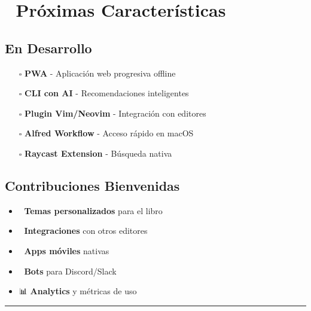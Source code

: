 \documentclass[
  11pt,
  letterpaper,
  oneside,
  openany]{scrbook}
\providecommand{\tightlist}{%
  \setlength{\itemsep}{0pt}\setlength{\parskip}{0pt}}
\begin{document}
\section{🚀 Próximas
Características}\label{pruxf3ximas-caracteruxedsticas}

\subsection{En Desarrollo}\label{en-desarrollo}

\begin{itemize}
\tightlist
\item[$\square$]
  \textbf{PWA} - Aplicación web progresiva offline
\item[$\square$]
  \textbf{CLI con AI} - Recomendaciones inteligentes\\
\item[$\square$]
  \textbf{Plugin Vim/Neovim} - Integración con editores
\item[$\square$]
  \textbf{Alfred Workflow} - Acceso rápido en macOS
\item[$\square$]
  \textbf{Raycast Extension} - Búsqueda nativa
\end{itemize}

\subsection{Contribuciones
Bienvenidas}\label{contribuciones-bienvenidas}

\begin{itemize}
\tightlist
\item
  🎨 \textbf{Temas personalizados} para el libro
\item
  🔌 \textbf{Integraciones} con otros editores
\item
  📱 \textbf{Apps móviles} nativas
\item
  🤖 \textbf{Bots} para Discord/Slack
\item
  📊 \textbf{Analytics} y métricas de uso
\end{itemize}

\begin{center}\rule{0.5\linewidth}{0.5pt}\end{center}
\end{document}
